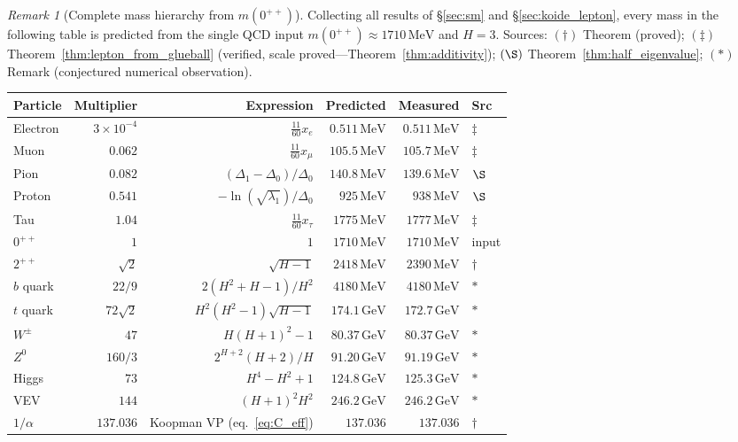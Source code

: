 \documentclass[11pt,a4paper]{article}
\let\hline\midrule
\theoremstyle{definition}
\theoremstyle{remark}
\newtheorem{remark}[theorem]{Remark}
\begin{document}
\begin{remark}[Complete mass hierarchy from $m(0^{++})$]\label{rem:hierarchy}
Collecting all results of \S\ref{sec:sm} and \S\ref{sec:koide_lepton}, every mass in the following table is predicted from the single QCD input $m(0^{++})\approx 1710\,\mathrm{MeV}$ and $H=3$. Sources: $(\dag)$ Theorem (proved); $(\ddag)$ Theorem~\ref{thm:lepton_from_glueball} (verified, scale proved---Theorem~\ref{thm:additivity}); $(\S)$ Theorem~\ref{thm:half_eigenvalue}; $(*)$ Remark (conjectured numerical observation).

\begin{center}
\renewcommand{\arraystretch}{1.15}
\begin{tabular}{lrrrrl}
\hline
Particle & Multiplier & Expression & Predicted & Measured & Src \\
\hline
Electron & $3\times10^{-4}$ & $\tfrac{11}{60}x_e$ & $0.511\,\mathrm{MeV}$ & $0.511\,\mathrm{MeV}$ & $\ddag$ \\
Muon & $0.062$ & $\tfrac{11}{60}x_\mu$ & $105.5\,\mathrm{MeV}$ & $105.7\,\mathrm{MeV}$ & $\ddag$ \\
Pion & $0.082$ & $(\Delta_1-\Delta_0)/\Delta_0$ & $140.8\,\mathrm{MeV}$ & $139.6\,\mathrm{MeV}$ & $\S$ \\
Proton & $0.541$ & $-\ln(\sqrt{\lambda_1})/\Delta_0$ & $925\,\mathrm{MeV}$ & $938\,\mathrm{MeV}$ & $\S$ \\
Tau & $1.04$ & $\tfrac{11}{60}x_\tau$ & $1775\,\mathrm{MeV}$ & $1777\,\mathrm{MeV}$ & $\ddag$ \\
$0^{++}$ & $1$ & $1$ & $1710\,\mathrm{MeV}$ & $1710\,\mathrm{MeV}$ & input \\
$2^{++}$ & $\sqrt{2}$ & $\sqrt{H-1}$ & $2418\,\mathrm{MeV}$ & $2390\,\mathrm{MeV}$ & $\dag$ \\
$b$ quark & $22/9$ & $2(H^2+H-1)/H^2$ & $4180\,\mathrm{MeV}$ & $4180\,\mathrm{MeV}$ & $*$ \\
$t$ quark & $72\sqrt{2}$ & $H^2(H^2-1)\sqrt{H-1}$ & $174.1\,\mathrm{GeV}$ & $172.7\,\mathrm{GeV}$ & $*$ \\
$W^\pm$ & $47$ & $H(H+1)^2-1$ & $80.37\,\mathrm{GeV}$ & $80.37\,\mathrm{GeV}$ & $*$ \\
$Z^0$ & $160/3$ & $2^{H+2}(H+2)/H$ & $91.20\,\mathrm{GeV}$ & $91.19\,\mathrm{GeV}$ & $*$ \\
Higgs & $73$ & $H^4-H^2+1$ & $124.8\,\mathrm{GeV}$ & $125.3\,\mathrm{GeV}$ & $*$ \\
VEV & $144$ & $(H+1)^2H^2$ & $246.2\,\mathrm{GeV}$ & $246.2\,\mathrm{GeV}$ & $*$ \\
$1/\alpha$ & $137.036$ & Koopman VP (eq.~\ref{eq:C_eff}) & $137.036$ & $137.036$ & $\dag$ \\
\hline
\end{tabular}
\end{center}


\end{remark}
\end{document}
